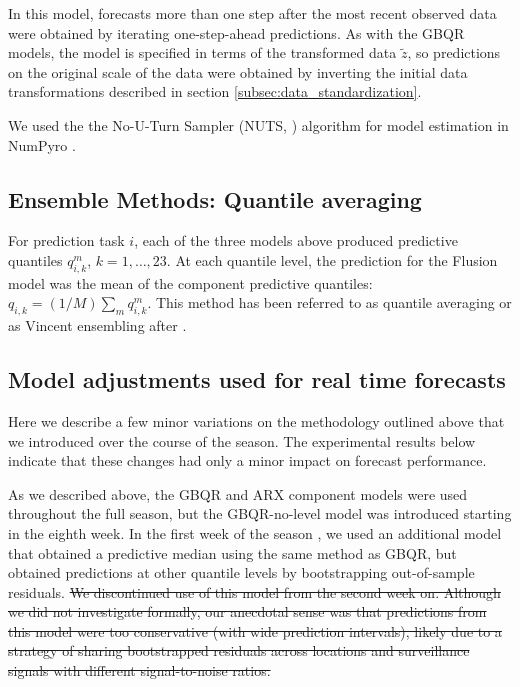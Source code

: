 \documentclass{article}\usepackage[]{graphicx}\usepackage[]{xcolor}
\providecommand{\DIFaddtex}[1]{{\protect\color{blue}\uwave{#1}}} %
\providecommand{\DIFdeltex}[1]{{\protect\color{red}\sout{#1}}}                      %
\providecommand{\DIFaddbegin}{} %
\providecommand{\DIFaddend}{} %
\providecommand{\DIFdelbegin}{} %
\providecommand{\DIFdelend}{} %
\providecommand{\DIFadd}[1]{\texorpdfstring{\DIFaddtex{#1}}{#1}} %
\providecommand{\DIFdel}[1]{\texorpdfstring{\DIFdeltex{#1}}{}} %
\newcommand{\DIFscaledelfig}{0.5}
\newlength{\DIFdelgraphicswidth} %
\newlength{\DIFdelgraphicsheight} %
\newcommand{\DIFaddincludegraphics}[2][]{{\color{blue}\fbox{\DIFOincludegraphics[#1]{#2}}}} %
\newcommand{\DIFdelincludegraphics}[2][]{%
\sbox{\DIFdelgraphicsbox}{\DIFOincludegraphics[#1]{#2}}%
\settoboxwidth{\DIFdelgraphicswidth}{\DIFdelgraphicsbox} %
\settoboxtotalheight{\DIFdelgraphicsheight}{\DIFdelgraphicsbox} %
\scalebox{\DIFscaledelfig}{%
\parbox[b]{\DIFdelgraphicswidth}{\usebox{\DIFdelgraphicsbox}\\[-\baselineskip] \rule{\DIFdelgraphicswidth}{0em}}\llap{\resizebox{\DIFdelgraphicswidth}{\DIFdelgraphicsheight}{%
\setlength{\unitlength}{\DIFdelgraphicswidth}%
\begin{picture}(1,1)%
\thicklines\linethickness{2pt} %
{\color[rgb]{1,0,0}\put(0,0){\framebox(1,1){}}}%
{\color[rgb]{1,0,0}\put(0,0){\line( 1,1){1}}}%
{\color[rgb]{1,0,0}\put(0,1){\line(1,-1){1}}}%
\end{picture}%
}\hspace*{3pt}}} %
} %
\DeclareRobustCommand{\DIFaddbegin}{\DIFOaddbegin \let\includegraphics\DIFaddincludegraphics} %
\DeclareRobustCommand{\DIFaddend}{\DIFOaddend \let\includegraphics\DIFOincludegraphics} %
\DeclareRobustCommand{\DIFdelbegin}{\DIFOdelbegin \let\includegraphics\DIFdelincludegraphics} %
\DeclareRobustCommand{\DIFdelend}{\DIFOaddend \let\includegraphics\DIFOincludegraphics} %
\begin{document}
In this model, forecasts more than one step after the most recent observed data were obtained by iterating one-step-ahead predictions. As with the GBQR models, the model is specified in terms of the transformed data $\tilde{z}$, so predictions on the original scale of the data were obtained by inverting the initial data transformations described in section \ref{subsec:data_standardization}.

We used the the No-U-Turn Sampler (NUTS, \cite{hoffman2014nuts}) algorithm for model estimation in NumPyro \cite{phan2019composable}.

\subsection{Ensemble Methods: Quantile averaging}
\label{subsec:model_ensemble}

For prediction task $i$, each of the three models above produced predictive quantiles $q^m_{i,k}$, $k = 1, \ldots, 23$.  At each quantile level, the prediction for the Flusion model was the mean of the component predictive quantiles: $q_{i,k} = (1/M) \sum_m q^m_{i,k}$. This method has been referred to as quantile averaging \cite[e.g., ][]{lichtendahl2013betterAveProbQuant} or as Vincent ensembling after \cite{vincent1912functionsOfVibrissae}.

\subsection{Model adjustments used for real time forecasts}
\label{subsec:model_realtime}

Here we describe a few minor variations on the methodology outlined above that we introduced over the course of the season. The experimental results below indicate that these changes had only a minor impact on forecast performance.

As we described above, the GBQR and ARX component models were used throughout the full season, but the GBQR-no-level model was introduced starting in the eighth week. In the first week of the season \DIFaddbegin \DIFadd{only}\DIFaddend , we used an additional model that obtained a predictive median using the same method as GBQR, but obtained predictions at other quantile levels by bootstrapping out-of-sample residuals.
\DIFdelbegin \DIFdel{We discontinued use of this model from the second week on. Although we did not investigate formally, our anecdotal sense was that predictions from this model were too conservative (with wide prediction intervals), likely due to a strategy of sharing bootstrapped residuals across locations and surveillance signals with different signal-to-noise ratios.
}\DIFdelend 
\end{document}
